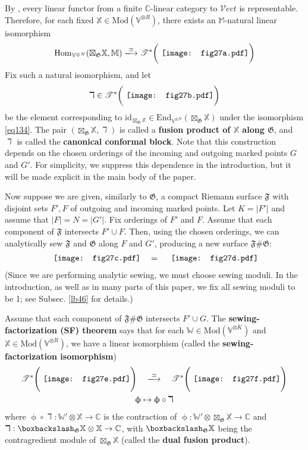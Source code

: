 \documentclass[11pt,b5paper,notitlepage]{article}
\theoremstyle{definition}
\theoremstyle{plain}
\newcommand{\End}{\mathrm{End}} %
\newcommand{\Hom}{\mathrm{Hom}}
\newcommand{\Vect}{\mathcal Vect}
\newcommand{\Vbb}{\mathbb V}
\newcommand{\Xbb}{\mathbb X}
\newcommand{\Wbb}{\mathbb W}
\newcommand{\Mbb}{\mathbb M}
\newcommand{\Cbb}{\mathbb C}
\newcommand{\<}{\left\langle}
\renewcommand{\>}{\right\rangle}
\newcommand{\ST}{\mathscr{T}}
\newcommand{\bbs}{\boxbackslash}
\newcommand{\Mod}{\mathrm{Mod}}
\newcommand{\id}{\mathrm{id}}
\newcommand{\ff}{\mathfrak{F}}
\newcommand{\fg}{\mathfrak{G}}
\numberwithin{equation}{section}
\begin{document}
By \cite{DSPS19-balanced}, every linear functor from a finite $\Cbb$-linear category to $\Vect$ is representable. Therefore, for each fixed $\Xbb\in\Mod(\Vbb^{\otimes R})$, there exists an $\Mbb$-natural linear isomorphism
\begin{align}\label{eq134}
\Hom_{\Vbb^{\otimes N}}(\boxtimes_\fg\Xbb,\Mbb)\xlongrightarrow{\simeq}\ST^*\bigg(\vcenter{\hbox{{
		\texttt{[image: fig27a.pdf]}}}}\bigg)
\end{align}
Fix such a natural isomorphism, and let
\begin{align*}
\daleth\in \ST^*\bigg(\vcenter{\hbox{{
		\texttt{[image: fig27b.pdf]}}}}\bigg)
\end{align*}
be the element corresponding to $\id_{\boxtimes_\fg\Xbb}\in\End_{\Vbb^{\otimes N}}(\boxtimes_\fg\Xbb)$ under the isomorphism \eqref{eq134}. The pair $(\boxtimes_\fg\Xbb,\daleth)$ is called a \textbf{fusion product of $\Xbb$ along $\fg$}, and $\daleth$ is called the \textbf{canonical conformal block}. Note that this construction depends on the chosen orderings of the incoming and outgoing marked points $G$ and $G'$. For simplicity, we suppress this dependence in the introduction, but it will be made explicit in the main body of the paper.

Now suppose we are given, similarly to $\fg$, a compact Riemann surface $\ff$ with disjoint sets $F',F$ of outgoing and incoming marked points. Let $K=|F'|$ and assume that $|F|=N=|G'|$. Fix orderings of $F'$ and $F$. Assume that each component of $\ff$ intersects $F'\cup F$. Then, using the chosen orderings, we can analytically sew $\ff$ and $\fg$ along $F$ and $G'$, producing a new surface $\ff \# \fg$:
\begin{align*}
\vcenter{\hbox{{
		\texttt{[image: fig27c.pdf]}}}}\quad=\quad\vcenter{\hbox{{
		\texttt{[image: fig27d.pdf]}}}}
\end{align*}
(Since we are performing analytic sewing, we must choose sewing moduli. In the introduction, as well as in many parts of this paper, we fix all sewing moduli to be 1; see Subsec. \ref{lb46} for details.)

Assume that each component of $\ff\#\fg$ intersects $F'\cup G$. The \textbf{sewing-factorization (SF) theorem} says that for each $\Wbb\in\Mod(\Vbb^{\otimes K})$ and $\Xbb\in\Mod(\Vbb^{\otimes R})$, we have a linear isomorphism (called the \textbf{sewing-factorization isomorphism})
\begin{gather}\label{eq135}
\begin{gathered}
\ST^*\Bigg(\vcenter{\hbox{{
		\texttt{[image: fig27e.pdf]}}}}\Bigg)\quad\xlongrightarrow{\simeq}\quad\ST^*\Bigg(\vcenter{\hbox{{
		\texttt{[image: fig27f.pdf]}}}}\Bigg)\\ \upphi\mapsto\upphi\circ\daleth
\end{gathered}
\end{gather}
where $\upphi\circ\daleth:\Wbb'\otimes\Xbb\rightarrow\Cbb$ is the contraction of $\upphi:\Wbb'\otimes\boxtimes_\fg\Xbb\rightarrow\Cbb$ and $\daleth:\bbs_\fg\Xbb\otimes\Xbb\rightarrow\Cbb$, with $\bbs_\fg\Xbb$ being the contragredient module of $\boxtimes_\fg\Xbb$ (called the \textbf{dual fusion product}). 
\end{document}
